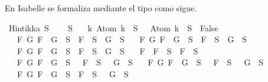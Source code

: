 \begin{isabellebody}
\begin{isamarkuptext}
  En Isabelle se formaliza mediante el tipo  como sigue.%
\end{isamarkuptext}\isamarkuptrue%
\isamarkupfalse%
\ {\isachardoublequoteopen}Hintikka\ S\ {\isasymequiv}\ \isanewline
{\isacharparenleft}{\isasymbottom}\ {\isasymnotin}\ S\isanewline
\ \ {\isasymand}\ {\isacharparenleft}{\isasymforall}k{\isachardot}\ Atom\ k\ {\isasymin}\ S\ {\isasymlongrightarrow}\ \isactrlbold {\isasymnot}\ {\isacharparenleft}Atom\ k{\isacharparenright}\ {\isasymin}\ S\ {\isasymlongrightarrow}\ False{\isacharparenright}\isanewline
\ \ {\isasymand}\ {\isacharparenleft}{\isasymforall}F\ G{\isachardot}\ F\ \isactrlbold {\isasymand}\ G\ {\isasymin}\ S\ {\isasymlongrightarrow}\ F\ {\isasymin}\ S\ {\isasymand}\ G\ {\isasymin}\ S{\isacharparenright}\isanewline
\ \ {\isasymand}\ {\isacharparenleft}{\isasymforall}F\ G{\isachardot}\ F\ \isactrlbold {\isasymor}\ G\ {\isasymin}\ S\ {\isasymlongrightarrow}\ F\ {\isasymin}\ S\ {\isasymor}\ G\ {\isasymin}\ S{\isacharparenright}\isanewline
\ \ {\isasymand}\ {\isacharparenleft}{\isasymforall}F\ G{\isachardot}\ F\ \isactrlbold {\isasymrightarrow}\ G\ {\isasymin}\ S\ {\isasymlongrightarrow}\ \isactrlbold {\isasymnot}F\ {\isasymin}\ S\ {\isasymor}\ G\ {\isasymin}\ S{\isacharparenright}\isanewline
\ \ {\isasymand}\ {\isacharparenleft}{\isasymforall}F{\isachardot}\ \isactrlbold {\isasymnot}\ {\isacharparenleft}\isactrlbold {\isasymnot}F{\isacharparenright}\ {\isasymin}\ S\ {\isasymlongrightarrow}\ F\ {\isasymin}\ S{\isacharparenright}\isanewline
\ \ {\isasymand}\ {\isacharparenleft}{\isasymforall}F\ G{\isachardot}\ \isactrlbold {\isasymnot}{\isacharparenleft}F\ \isactrlbold {\isasymand}\ G{\isacharparenright}\ {\isasymin}\ S\ {\isasymlongrightarrow}\ \isactrlbold {\isasymnot}\ F\ {\isasymin}\ S\ {\isasymor}\ \isactrlbold {\isasymnot}\ G\ {\isasymin}\ S{\isacharparenright}\isanewline
\ \ {\isasymand}\ {\isacharparenleft}{\isasymforall}F\ G{\isachardot}\ \isactrlbold {\isasymnot}{\isacharparenleft}F\ \isactrlbold {\isasymor}\ G{\isacharparenright}\ {\isasymin}\ S\ {\isasymlongrightarrow}\ \isactrlbold {\isasymnot}\ F\ {\isasymin}\ S\ {\isasymand}\ \isactrlbold {\isasymnot}\ G\ {\isasymin}\ S{\isacharparenright}\isanewline
\ \ {\isasymand}\ {\isacharparenleft}{\isasymforall}F\ G{\isachardot}\ \isactrlbold {\isasymnot}{\isacharparenleft}F\ \isactrlbold {\isasymrightarrow}\ G{\isacharparenright}\ {\isasymin}\ S\ {\isasymlongrightarrow}\ F\ {\isasymin}\ S\ {\isasymand}\ \isactrlbold {\isasymnot}\ G\ {\isasymin}\ S{\isacharparenright}{\isacharparenright}{\isachardoublequoteclose}%

\end{isabellebody}
